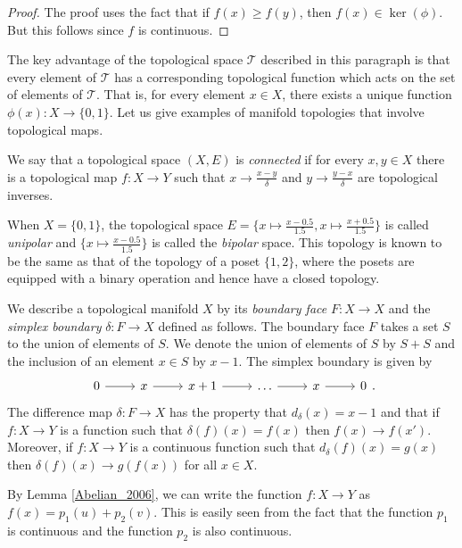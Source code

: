 \documentclass[a4paper,reqno,oneside]{article}
\begin{document}
\begin{proof}
    The proof uses the fact that if $f(x) \geq f(y)$, then $f(x) \in \ker(\phi)$. But this follows since $f$ is continuous. 
\end{proof}

The key advantage of the topological space $\mathcal{T}$ described in this paragraph is that every element of $\mathcal{T}$ has a corresponding topological function which acts on the set of elements of $\mathcal{T}$. That is, for every element $x \in X$, there exists a unique function $\phi(x) : X \to \{0,1\}$. Let us give examples of manifold topologies that involve topological maps. 

\begin{definition}
    We say that a topological space $(X,E)$ is \emph{connected} if for every $x, y \in X$ there is a topological map $f: X \to Y$ such that $x \to \frac{x - y}{\delta}$ and $y \to \frac{y - x}{\delta}$ are topological inverses. 
\end{definition}

\begin{example}
    When $X = \{0,1\}$, the topological space $E = \{x \mapsto \frac{x - 0.5}{1.5}, x \mapsto \frac{x + 0.5}{1.5}\}$ is called \emph{unipolar} and $\{x \mapsto \frac{x - 0.5}{1.5}\}$ is called the \emph{bipolar} space. This topology is known to be the same as that of the topology of a poset $\{1,2\}$, where the posets are equipped with a binary operation and hence have a closed topology.
\end{example}

We describe a topological manifold $X$ by its \emph{boundary face} $F: X \to X$ and the \emph{simplex boundary} $\delta: F \to X$ defined as follows. The boundary face $F$ takes a set $S$ to the union of elements of $S$. We denote the union of elements of $S$ by $S + S$ and the inclusion of an element $x \in S$ by $x - 1$. The simplex boundary is given by 
\[
    \begin{tikzcd}
        0 \ar[r] & x \ar[r] & x + 1 \ar[r] & \dots \ar[r] & x \ar[r] & 0
    \end{tikzcd}.
\]
The difference map $\delta: F \to X$ has the property that $d_\delta(x) = x - 1$ and that if $f: X \to Y$ is a function such that $\delta(f)(x) = f(x)$ then $f(x) \to f(x')$. Moreover, if $f: X \to Y$ is a continuous function such that $d_\delta(f)(x) = g(x)$ then $\delta(f)(x) \to g(f(x))$ for all $x \in X$. 

By Lemma \ref{Abelian_2006}, we can write the function $f: X \to Y$ as $f(x) = p_1(u) + p_2(v)$. This is easily seen from the fact that the function $p_1$ is continuous and the function $p_2$ is also continuous. 
\end{document}

